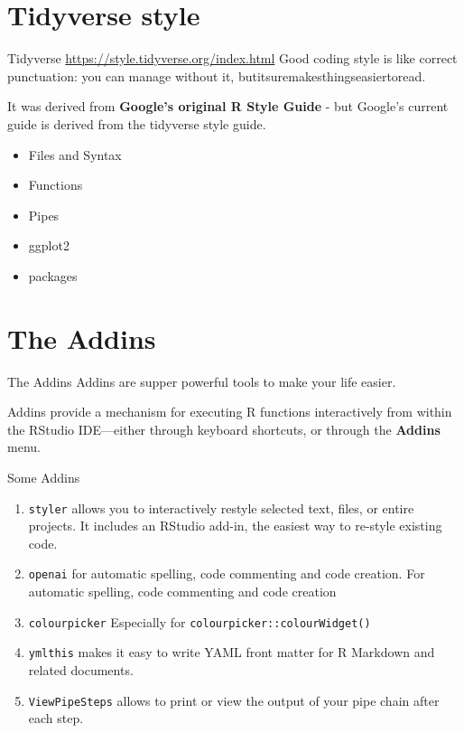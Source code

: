 \documentclass[
  ignorenonframetext,
]{beamer}
\begin{document}
\section{Tidyverse style}\label{tidyverse-style}

\begin{frame}{Tidyverse \url{https://style.tidyverse.org/index.html}}
\label{tidyverse-httpsstyle.tidyverse.orgindex.html}
Good coding style is like correct punctuation: you can manage without
it, butitsuremakesthingseasiertoread.

It was derived from \textbf{Google's original R Style Guide} - but
Google's current guide is derived from the tidyverse style guide.

\begin{itemize}
\item
  Files and Syntax
\item
  Functions
\item
  Pipes
\item
  ggplot2
\item
  packages
\end{itemize}
\end{frame}

\section{The Addins}\label{the-addins}

\begin{frame}{The Addins}
Addins are supper powerful tools to make your life easier.

Addins provide a mechanism for executing R functions interactively from
within the RStudio IDE---either through keyboard shortcuts, or through
the \textbf{Addins} menu.
\end{frame}

\begin{frame}[fragile]{Some Addins}
\label{some-addins}
\begin{enumerate}
\item
  \texttt{styler} allows you to interactively restyle selected text,
  files, or entire projects. It includes an RStudio add-in, the easiest
  way to re-style existing code.
\item
  \texttt{openai} for automatic spelling, code commenting and code
  creation. For automatic spelling, code commenting and code creation
\item
  \texttt{colourpicker} Especially for
  \texttt{colourpicker::colourWidget()}
\item
  \texttt{ymlthis} makes it easy to write YAML front matter for R
  Markdown and related documents.
\item
  \texttt{ViewPipeSteps} allows to print or view the output of your pipe
  chain after each step.
\end{enumerate}
\end{frame}
\end{document}
